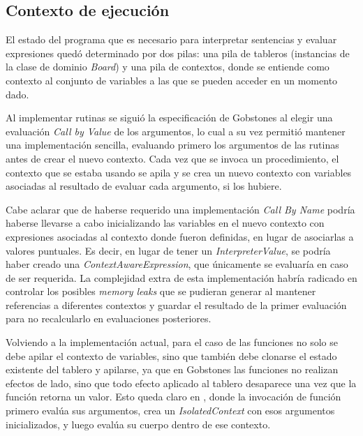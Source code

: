 

\subsection{Contexto de ejecución}

El estado del programa que es necesario para interpretar sentencias y evaluar expresiones quedó determinado por dos pilas: una pila de tableros (instancias de la clase de dominio \textit{Board}) y una pila de contextos, donde se entiende como contexto al conjunto de variables a las que se pueden acceder en un momento dado.

Al implementar rutinas se siguió la especificación de Gobstones al elegir una evaluación \textit{Call by Value} \cite{DowekL11} de los argumentos, lo cual a su vez permitió mantener una implementación sencilla, evaluando primero los argumentos de las rutinas antes de crear el nuevo contexto. 
Cada vez que se invoca un procedimiento, el contexto que se estaba usando se apila y se crea un nuevo contexto con variables asociadas al resultado de evaluar cada argumento, si los hubiere. 

Cabe aclarar que de haberse requerido una implementación \textit{Call By Name} podría haberse llevarse a cabo inicializando las variables en el nuevo contexto con expresiones asociadas al contexto donde fueron definidas, en lugar de asociarlas a valores puntuales. Es decir, en lugar de tener un \textit{InterpreterValue}, se podría haber creado una \textit{ContextAwareExpression}, que únicamente se evaluaría en caso de ser requerida. La complejidad extra de esta implementación habría radicado en controlar los posibles \textit{memory leaks} que se pudieran generar al mantener referencias a diferentes contextos y guardar el resultado de la primer evaluación para no recalcularlo en evaluaciones posteriores.

Volviendo a la implementación actual, para el caso de las funciones no solo se debe apilar el contexto de variables, sino que también debe clonarse el estado existente del tablero y apilarse, ya que en Gobstones las funciones no realizan efectos de lado, sino que todo efecto aplicado al tablero desaparece una vez que la función retorna un valor. Esto queda claro en , donde la invocación de función primero evalúa sus argumentos, crea un \textit{IsolatedContext} con esos argumentos inicializados, y luego evalúa su cuerpo dentro de ese contexto.


